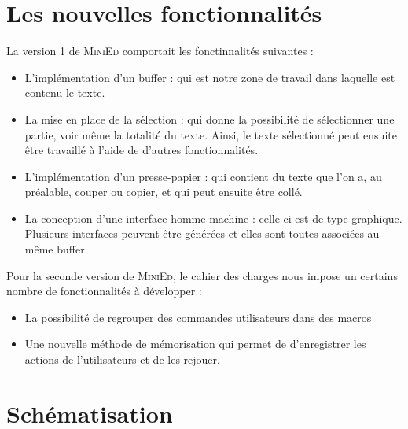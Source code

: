 \documentclass[a4paper, 12pt]{report}
\begin{document}
		\section*{Les nouvelles fonctionnalités}

		La version 1 de \textsc{MiniEd} comportait les fonctinnalités suivantes :

		\begin{itemize}
			\item L'implémentation d’un buffer : qui est notre zone de travail dans laquelle est contenu le texte.

			\item La mise en place de la sélection : qui donne la possibilité de sélectionner une partie, voir même la totalité du texte. Ainsi, le texte sélectionné peut ensuite être travaillé à l’aide de d’autres fonctionnalités.

			\item L’implémentation d’un presse-papier : qui contient du texte que l’on a, au préalable, couper ou copier, et qui peut ensuite être collé.

			\item La conception d’une interface homme-machine : celle-ci est de type graphique. Plusieurs interfaces peuvent être générées et elles sont toutes associées au même buffer. 

		\end{itemize}

		\vspace{0.5cm}

		Pour la seconde version de \textsc{MiniEd}, le cahier des charges nous impose un certains nombre de fonctionnalités à développer :

		\begin{itemize}
			\item La possibilité de regrouper des commandes utilisateurs dans des macros

			\item Une nouvelle méthode de mémorisation qui permet de d'enregistrer les actions de l'utilisateurs et de les rejouer. 

		\end{itemize}

		\section*{Schématisation}
\end{document}
